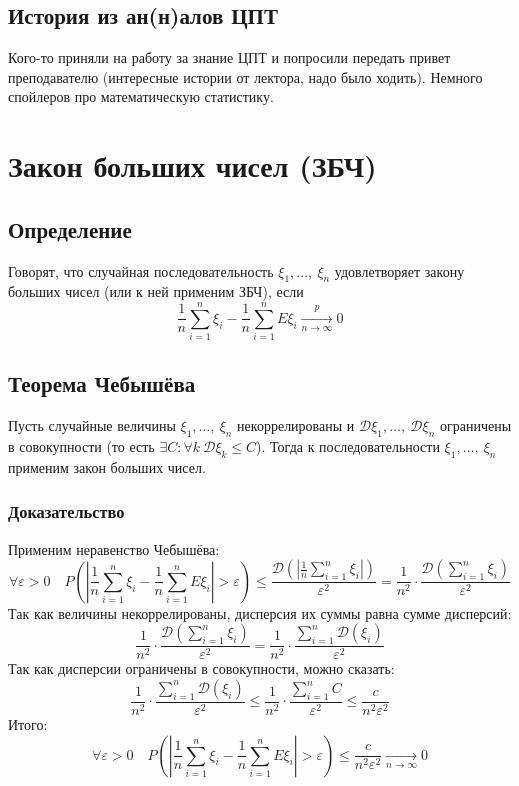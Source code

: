 \documentclass[12pt, a4paper]{article}
\begin{document}
    \subsection*{История из ан(н)алов ЦПТ}
    Кого-то приняли на работу за знание ЦПТ и попросили передать привет преподавателю (интересные истории от лектора, надо было ходить). Немного спойлеров про математическую статистику.
    \section*{Закон больших чисел (ЗБЧ)}
    \subsection*{Определение}
    Говорят, что случайная последовательность $\xi_1,\dots,\ \xi_n$ удовлетворяет закону больших чисел (или к ней применим ЗБЧ), если
    \[\frac{1}{n}\sum_{i=1}^{n} \xi_i - \frac{1}{n}\sum_{i = 1}^{n} E\xi_i \xrightarrow[n\to\infty]{p} 0\]
    \subsection*{Теорема Чебышёва}
    Пусть случайные величины $\xi_1,\dots,\ \xi_n$ некоррелированы и $\mathcal{D}\xi_1,\dots,\ \mathcal{D}\xi_n$ ограничены в совокупности (то есть $\exists C: \forall k\ \mathcal{D}\xi_k \leq C$). Тогда к последовательности $\xi_1,\dots,\ \xi_n$ применим закон больших чисел.
    \subsubsection*{Доказательство}
    Применим неравенство Чебышёва:
    \[\forall \varepsilon > 0\quad P\left(\left| \frac{1}{n}\sum_{i = 1}^{n} \xi_i - \frac{1}{n} \sum_{i = 1}^{n} E\xi_i \right| > \varepsilon\right) \leq \frac{\mathcal{D}\left( \left| \frac{1}{n}\sum_{i = 1}^{n} \xi_i\right| \right)}{\varepsilon^2} = \frac{1}{n^2}\cdot \frac{\mathcal{D}(\sum_{i = 1}^{n} \xi_i)}{\varepsilon^2}\]
    Так как величины некоррелированы, дисперсия их суммы равна сумме дисперсий:
    \[\frac{1}{n^2}\cdot \frac{\mathcal{D}(\sum_{i = 1}^{n} \xi_i)}{\varepsilon^2} = \frac{1}{n^2}\cdot \frac{\sum_{i = 1}^{n}\mathcal{D}( \xi_i)}{\varepsilon^2}\]
    Так как дисперсии ограничены в совокупности, можно сказать:
    \[\frac{1}{n^2}\cdot \frac{\sum_{i = 1}^{n}\mathcal{D}( \xi_i)}{\varepsilon^2} \leq \frac{1}{n^2}\cdot \frac{\sum_{i = 1}^{n}C}{\varepsilon^2} \leq \frac{c}{n^2\varepsilon^2}\]
    Итого:
    \[\forall \varepsilon > 0\quad P\left(\left| \frac{1}{n}\sum_{i = 1}^{n} \xi_i - \frac{1}{n} \sum_{i = 1}^{n} E\xi_i \right| > \varepsilon\right) \leq \frac{c}{n^2\varepsilon^2}\xrightarrow[n\to \infty]{} 0\]
\end{document}
